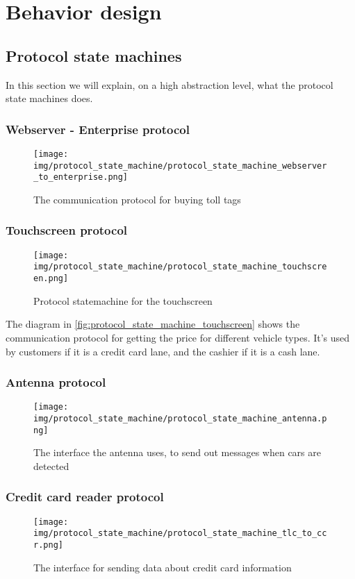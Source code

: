 \section*{Behavior design}
\subsection*{Protocol state machines}
In this section we will explain, on a high abstraction level, what the protocol state machines does.
\subsubsection*{Webserver - Enterprise protocol}
\begin{figure}
\centering
\texttt{[image: img/protocol\_state\_machine/protocol\_state\_machine\_webserver\_to\_enterprise.png]}
\caption{The communication protocol for buying toll tags}
\label{fig:protocol_state_machine_webserver_to_enterprise}
\end{figure}

\subsubsection*{Touchscreen protocol}
\begin{figure}
\centering
\texttt{[image: img/protocol\_state\_machine/protocol\_state\_machine\_touchscreen.png]}
\caption{Protocol statemachine for the touchscreen}
\label{fig:protocol_state_machine_touchscreen}
\end{figure}
The diagram in \autoref{fig:protocol_state_machine_touchscreen} shows the communication protocol for getting the price for different vehicle types. It's used by customers if it is a credit card lane, and the cashier if it is a cash lane.

\subsubsection*{Antenna protocol}
\begin{figure}
\centering
\texttt{[image: img/protocol\_state\_machine/protocol\_state\_machine\_antenna.png]}
\caption{The interface the antenna uses, to send out messages when cars are detected}
\label{fig:protocol_state_machine_antenna}
\end{figure}

\subsubsection*{Credit card reader protocol}
\begin{figure}
\centering
\texttt{[image: img/protocol\_state\_machine/protocol\_state\_machine\_tlc\_to\_ccr.png]}
\caption{The interface for sending data about credit card information}
\label{fig:protocol_state_machine_tlc_to_ccr}
\end{figure}

